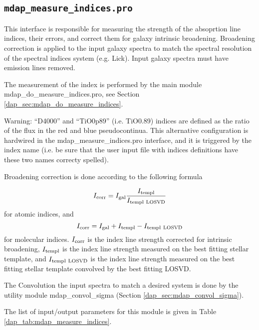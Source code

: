 \subsection{{\tt mdap\_measure\_indices.pro}}
\label{dap_sec:mdap_measure_indices}

This interface is responsible for measuring the strength of the
absoprtion line indices, their errors, and correct them for galaxy
intrinsic broadening. Broadening correction is applied to the input
galaxy spectra to match the spectral resolution of the spectral
indices system (e.g. Lick). Input galaxy spectra must have emission
lines removed.

The measurement of the index is performed by the main module
mdap\_do\_measure\_indices.pro, see Section
\ref{dap_sec:mdap_do_measure_indices}.

Warning: ``D4000'' and ``TiO0p89'' (i.e. TiO0.89) indices are defined
as the ratio of the flux in the red and blue pseudocontinua. This
alternative configuration is hardwired in the
mdap\_measure\_indices.pro interface, and it is triggered by the index
name (i.e. be sure that the user input file with indices definitions
have these two names correcty spelled).

Broadening correction is done according to the following formula

\[
I_{\rm corr} = I_{\rm gal} \frac{I_{\rm templ}}{I_{\rm templ\ LOSVD}}
\]
for atomic indices, and 
\[
I_{\rm corr} = I_{\rm gal} + I_{\rm templ} - I_{\rm templ\ LOSVD}
\]
for molecular indices.  $I_{\rm corr}$ is the index line strength
corrected for intrinsic broadening, $I_{\rm templ}$ is the index line
strength measured on the best fitting stellar template, and $I_{\rm
  templ\ LOSVD}$ is the index line strength measured on the best
fitting stellar template convolved by the best fitting LOSVD.

The Convolution the input spectra to match a desired system is done by
the utility module mdap\_convol\_sigma (Section
\ref{dap_sec:mdap_convol_sigma}).

The list of input/output parameters for this module is given in Table
\ref{dap_tab:mdap_measure_indices}.


